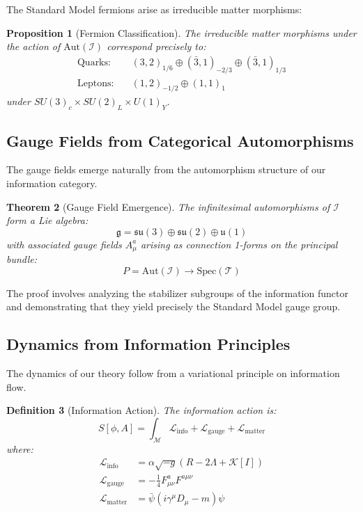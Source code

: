 \documentclass[12pt,a4paper]{article}
\newtheorem{theorem}{Theorem}[section]
\newtheorem{proposition}[theorem]{Proposition}
\newtheorem{definition}[theorem]{Definition}
\begin{document}
The Standard Model fermions arise as irreducible matter morphisms:

\begin{proposition}[Fermion Classification]
The irreducible matter morphisms under the action of $\text{Aut}(\mathcal{I})$ correspond precisely to:
\begin{align}
\text{Quarks}: &\quad (3, 2)_{1/6} \oplus (\bar{3}, 1)_{-2/3} \oplus (\bar{3}, 1)_{1/3} \\
\text{Leptons}: &\quad (1, 2)_{-1/2} \oplus (1, 1)_{1}
\end{align}
under $SU(3)_c \times SU(2)_L \times U(1)_Y$.
\end{proposition}

\subsection{Gauge Fields from Categorical Automorphisms}

The gauge fields emerge naturally from the automorphism structure of our information category.

\begin{theorem}[Gauge Field Emergence]
The infinitesimal automorphisms of $\mathcal{I}$ form a Lie algebra:
\begin{equation}
\mathfrak{g} = \mathfrak{su}(3) \oplus \mathfrak{su}(2) \oplus \mathfrak{u}(1)
\end{equation}
with associated gauge fields $A_\mu^a$ arising as connection 1-forms on the principal bundle:
\begin{equation}
P = \text{Aut}(\mathcal{I}) \to \text{Spec}(\mathcal{T})
\end{equation}
\end{theorem}

The proof involves analyzing the stabilizer subgroups of the information functor and demonstrating that they yield precisely the Standard Model gauge group.

\subsection{Dynamics from Information Principles}

The dynamics of our theory follow from a variational principle on information flow.

\begin{definition}[Information Action]
The information action is:
\begin{equation}
S[\phi, A] = \int_{\mathcal{M}} \mathcal{L}_{\text{info}} + \mathcal{L}_{\text{gauge}} + \mathcal{L}_{\text{matter}}
\end{equation}
where:
\begin{align}
\mathcal{L}_{\text{info}} &= \alpha \sqrt{-g} \left( R - 2\Lambda + \mathcal{K}[I] \right) \\
\mathcal{L}_{\text{gauge}} &= -\frac{1}{4} F_{\mu\nu}^a F^{a\mu\nu} \\
\mathcal{L}_{\text{matter}} &= \bar{\psi}(i\gamma^\mu D_\mu - m)\psi
\end{align}
\end{definition}
\end{document}
